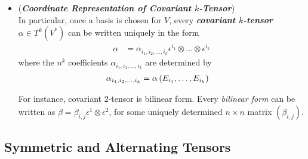 \documentclass[11pt]{article}
\begin{document}
\begin{itemize}
\item \begin{remark} (\emph{\textbf{Coordinate Representation of Covariant $k$-Tensor}})\\
In particular, once a basis is chosen for $V$, every \emph{\textbf{covariant $k$-tensor}} $\alpha \in T^{k}(V^{*})$ can be written uniquely in the form
\begin{align}
\alpha &= \alpha_{i_1,i_2,\ldots, i_k} \epsilon^{i_1} \otimes \ldots \otimes \epsilon^{i_k}  \label{eqn: coordinate_represent_covariant_k_tensor}
\end{align}
where the $n^k$ coefficients $\alpha_{i_1,i_2,\ldots, i_k}$ are determined by
\begin{align}
\alpha_{i_1,i_2,\ldots, i_k} &= \alpha\left(E_{i_1} , \ldots , E_{i_k}\right) \label{eqn: coordinate_represent_covariant_k_tensor_coefficient}
\end{align}

For instance, covariant $2$-tensor is bilinear form. Every \emph{bilinear form} can be written as $\beta = \beta_{i,j} \epsilon^1 \otimes \epsilon^2$, for some uniquely determined $n\times n$ matrix $(\beta_{i,j})$.
\end{remark}
\end{itemize}
\subsection{Symmetric and Alternating Tensors}
\end{document}
